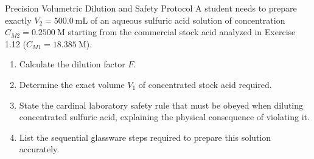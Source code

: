 \begin{exercise}{Precision Volumetric Dilution and Safety Protocol}
A student needs to prepare exactly $V_2 = 500.0\ \mathrm{mL}$ of an aqueous sulfuric acid solution of concentration $C_{M2} = 0.2500\ \mathrm{M}$ starting from the commercial stock acid analyzed in Exercise 1.12 ($C_{M1} = 18.385\ \mathrm{M}$).
\begin{enumerate}[leftmargin=1.5em,itemsep=2pt]
  \item Calculate the dilution factor $F$.
  \item Determine the exact volume $V_1$ of concentrated stock acid required.
  \item State the cardinal laboratory safety rule that must be obeyed when diluting concentrated sulfuric acid, explaining the physical consequence of violating it.
  \item List the sequential glassware steps required to prepare this solution accurately.
\end{enumerate}
\end{exercise}

\begin{tabletworkspace}[5.0cm]
\end{tabletworkspace}

